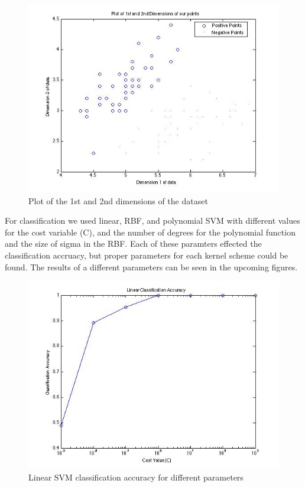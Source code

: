 \documentclass[paper=a4, fontsize=11pt]{scrartcl} %
\begin{document}
\begin{figure}
\centering
\includegraphics[scale=0.4]{serperability.jpg}
\caption{Plot of the 1st and 2nd dimensions of the dataset}
\label{fig:plot_2d}
\end{figure}

For classification we used linear, RBF, and polynomial SVM with different values for the cost variable (C), and the number of degrees for the polynomial function and the size of sigma in the RBF.
Each of these paramters effected the classification accruacy, but proper parameters for each kernel scheme could be found.
The results of a different parameters can be seen in the upcoming figures.

\begin{figure}
\centering
\includegraphics[scale=0.4]{linear.jpg}
\caption{Linear SVM classification accuracy for different parameters}
\label{fig:plot_2d}
\end{figure}
\end{document}
